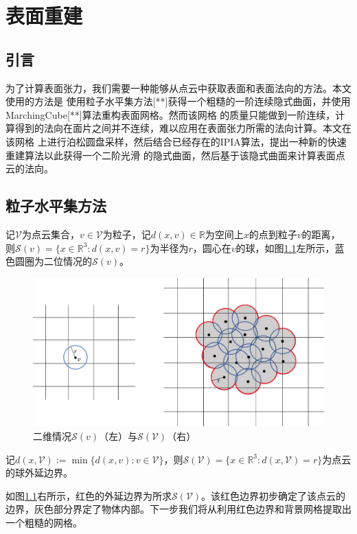 \chapter{表面重建} \label{chap3}
\section{引言}
为了计算表面张力，我们需要一种能够从点云中获取表面和表面法向的方法。本文使用的方法是
使用粒子水平集方法[**]获得一个粗糙的一阶连续隐式曲面，并使用MarchingCube[**]算法重构表面网格。然而该网格
的质量只能做到一阶连续，计算得到的法向在面片之间并不连续，难以应用在表面张力所需的法向计算。本文在该网格
上进行泊松圆盘采样，然后结合已经存在的IPIA算法，提出一种新的快速重建算法以此获得一个二阶光滑
的隐式曲面，然后基于该隐式曲面来计算表面点云的法向。
\section{粒子水平集方法}
记$\mathcal{V}$为点云集合，$v\in \mathcal{V}$为粒子，记$d(x,v)\in \mathbb{R}$为空间上$x$的点到粒子$v$的距离，
则$\mathcal{S}(v) = \{x\in \mathbb{R}^3: d(x,v) = r\}$为半径为$r$，圆心在$v$的球，如图\ref{fig:particle levelset}左所示，蓝色圆圈为二位情况的$\mathcal{S}(v)$。
\begin{figure}[htbp]
    \centering
    \includegraphics[scale=1.0]{./images/image3.png}
    \caption{二维情况$\mathcal{S}(v)$（左）与$\mathcal{S}(\mathcal{V})$（右）}
    \label{fig:particle levelset}
\end{figure}

记$d(x,\mathcal{V}):= \min \{ d(x,v): v\in \mathcal{V}\}$，则$\mathcal{S}(\mathcal{V}) = \{x\in \mathbb{R}^3: d(x,\mathcal{V}) = r\}$为点云的球外延边界。

如图\ref{fig:particle levelset}右所示，红色的外延边界为所求$\mathcal{S}(\mathcal{V})$。该红色边界初步确定了该点云的边界，灰色部分界定了物体内部。下一步我们将从利用红色边界和背景网格提取出
一个粗糙的网格。

